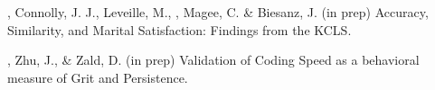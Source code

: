 \item \meb, Connolly, J. J., Leveille, M., \jjj, Magee, C. \& Biesanz, J. (in prep) Accuracy, Similarity, and Marital Satisfaction: Findings from the KCLS.
\item \meb, Zhu, J., \& Zald, D. (in prep) Validation of Coding Speed as a behavioral measure of Grit and Persistence.
\vspace{-2mm}\begin{center}\end{center} \vspace{-4mm}